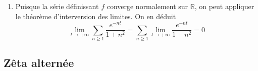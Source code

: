 \begin{enumerate}
\begin{enumerate}
                    \[
                        \frac{f(h)-f(0)}{h}=\sum_{n=1}^{+\infty}\frac{e^{-nh}-1}{h(1+n^2)}
                    \]
                    Puisque, pour tout $n\geqslant 1$, $e^{-nh}\leqslant 1$, on en déduit que 
                    \[
                        \frac{f(h)-f(0)}{h}\leqslant \sum\limits_{n=1}^N \frac{e^{-nh}-1}{h(1+n^2)}
                    \]
                    D'après le résultat de la question précédente, on peut trouver $\delta<0$ tel que, pour tout $h\in]0,\delta[$, on a
                    \[
                        \frac{f(h)-f(0)}{h}\leqslant -A+1
                    \]
                    Ceci est la définition de $\lim\limits_{h\to 0^{+}}\frac{f(h)-f(0)}{h}=-\infty$. Ainsi, $f$ n'est pas dérivable en 0, mais sa courbe représentative admet au point d'abscisse 0 une tangente verticale.
            \end{enumerate}
    \item Puisque la série définissant $f$ converge normalement sur $\mathbb R$, on peut appliquer le théorème d'interversion des limites. On en déduit
        \[
            \lim_{t\to+\infty}\sum_{n\geq 1}\frac{e^{-nt}}{1+n^2}=\sum_{n\geq 1}\lim_{t\to+\infty}\frac{e^{-nt}}{1+n^2}=0
        \]
\end{enumerate}

\subsection{Zêta alternée}

